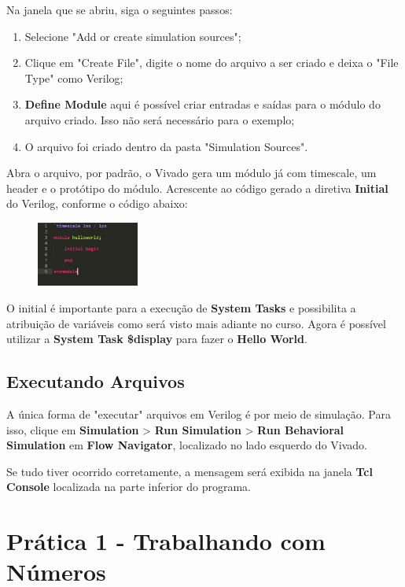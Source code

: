 \documentclass[a4paper]{article}
\begin{document}
Na janela que se abriu, siga o seguintes passos:

\begin{enumerate}
\item Selecione "Add or create simulation sources";
\item Clique em "Create File", digite o nome do arquivo a ser criado e deixa o "File Type" como Verilog;
\item \textbf{Define Module} aqui é possível criar entradas e saídas para o módulo do arquivo criado. Isso não será necessário para o exemplo;
\item O arquivo foi criado dentro da pasta "Simulation Sources".
\end{enumerate}

Abra o arquivo, por padrão, o Vivado gera um módulo já com timescale, um header e o protótipo do módulo. Acrescente ao código gerado a diretiva \textbf{Initial} do Verilog, conforme o código abaixo:

\begin{figure}[H]
\centering
	\includegraphics[width=0.3\textwidth]{images/helloworld.jpg}
\end{figure}

O initial é importante para a execução de \textbf{System Tasks} e possibilita a atribuição de variáveis como será visto mais adiante no curso. Agora é possível utilizar a \textbf{System Task \$display} para fazer o \textbf{Hello World}. 

\subsection*{Executando Arquivos}

A única forma de "executar" arquivos em Verilog é por meio de simulação. Para isso, clique em \textbf{Simulation} > \textbf{Run Simulation} > \textbf{Run Behavioral Simulation} em \textbf{Flow Navigator}, localizado no lado esquerdo do Vivado.

Se tudo tiver ocorrido corretamente, a mensagem será exibida na janela \textbf{Tcl Console} localizada na parte inferior do programa.

\section*{Prática 1 - Trabalhando com Números}
\end{document}

